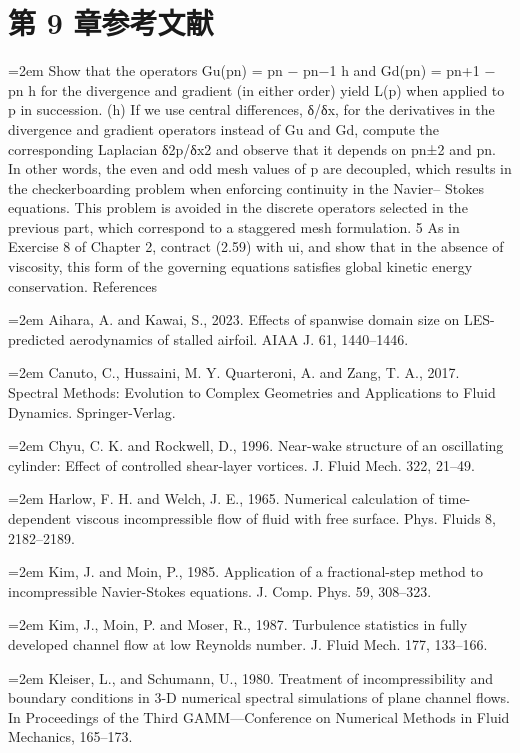 \documentclass[12pt,a4paper,openany,fontset=none]{ctexbook}
\begin{document}
\section*{第 9 章参考文献}
\par\hangindent=2em Show that the operators Gu(pn) = pn − pn−1 h and Gd(pn) = pn+1 − pn h for the divergence and gradient (in either order) yield L(p) when applied to p in succession. (h) If we use central differences, δ/δx, for the derivatives in the divergence and gradient operators instead of Gu and Gd, compute the corresponding Laplacian δ2p/δx2 and observe that it depends on pn±2 and pn. In other words, the even and odd mesh values of p are decoupled, which results in the checkerboarding problem when enforcing continuity in the Navier– Stokes equations. This problem is avoided in the discrete operators selected in the previous part, which correspond to a staggered mesh formulation. 5 As in Exercise 8 of Chapter 2, contract (2.59) with ui, and show that in the absence of viscosity, this form of the governing equations satisfies global kinetic energy conservation. References
\par\hangindent=2em Aihara, A. and Kawai, S., 2023. Effects of spanwise domain size on LES-predicted aerodynamics of stalled airfoil. AIAA J. 61, 1440–1446.
\par\hangindent=2em Canuto, C., Hussaini, M. Y. Quarteroni, A. and Zang, T. A., 2017. Spectral Methods: Evolution to Complex Geometries and Applications to Fluid Dynamics. Springer-Verlag.
\par\hangindent=2em Chyu, C. K. and Rockwell, D., 1996. Near-wake structure of an oscillating cylinder: Effect of controlled shear-layer vortices. J. Fluid Mech. 322, 21–49.
\par\hangindent=2em Harlow, F. H. and Welch, J. E., 1965. Numerical calculation of time-dependent viscous incompressible flow of fluid with free surface. Phys. Fluids 8, 2182–2189.
\par\hangindent=2em Kim, J. and Moin, P., 1985. Application of a fractional-step method to incompressible Navier-Stokes equations. J. Comp. Phys. 59, 308–323.
\par\hangindent=2em Kim, J., Moin, P. and Moser, R., 1987. Turbulence statistics in fully developed channel flow at low Reynolds number. J. Fluid Mech. 177, 133–166.
\par\hangindent=2em Kleiser, L., and Schumann, U., 1980. Treatment of incompressibility and boundary conditions in 3-D numerical spectral simulations of plane channel flows. In Proceedings of the Third GAMM—Conference on Numerical Methods in Fluid Mechanics, 165–173.
\end{document}
